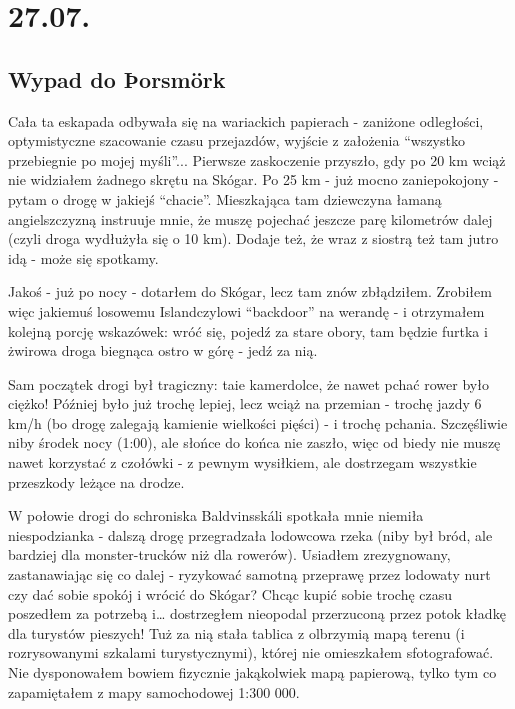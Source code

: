 \chapter{27.07.}

\section{Wypad do Þorsmörk}


Cała ta eskapada odbywała się na wariackich papierach - zaniżone odległości, optymistyczne szacowanie czasu przejazdów, wyjście z założenia “wszystko przebiegnie po mojej myśli”... Pierwsze zaskoczenie przyszło, gdy po 20 km wciąż nie widziałem żadnego skrętu na Skógar. Po 25 km - już mocno zaniepokojony - pytam o drogę w jakiejś “chacie”. Mieszkająca tam dziewczyna łamaną angielszczyzną instruuje mnie, że muszę pojechać jeszcze parę kilometrów dalej (czyli droga wydłużyła się o 10 km). Dodaje też, że wraz z siostrą też tam jutro idą - może się spotkamy.

Jakoś - już po nocy - dotarłem do Skógar, lecz tam znów zbłądziłem. Zrobiłem więc jakiemuś losowemu Islandczylowi “backdoor” na werandę - i otrzymałem kolejną porcję wskazówek: wróć się, pojedź za stare obory, tam będzie furtka i żwirowa droga biegnąca ostro w górę - jedź za nią.

Sam początek drogi był tragiczny: taie kamerdolce, że nawet pchać rower było ciężko! Później było już trochę lepiej, lecz wciąż na przemian - trochę jazdy 6 km/h (bo drogę zalegają kamienie wielkości pięści) - i trochę pchania. Szczęśliwie niby środek nocy (1:00), ale słońce do końca nie zaszło, więc od biedy nie muszę nawet korzystać z czołówki - z pewnym wysiłkiem, ale dostrzegam wszystkie przeszkody leżące na drodze.

W połowie drogi do schroniska Baldvinsskáli spotkała mnie niemiła niespodzianka - dalszą drogę przegradzała lodowcowa rzeka (niby był bród, ale bardziej dla monster-trucków niż dla rowerów). Usiadłem zrezygnowany, zastanawiając się co dalej - ryzykować samotną przeprawę przez lodowaty nurt czy dać sobie spokój i wrócić do Skógar? Chcąc kupić sobie trochę czasu poszedłem za potrzebą i… dostrzegłem nieopodal przerzuconą przez potok kładkę dla turystów pieszych! Tuż za nią stała tablica z olbrzymią mapą terenu (i rozrysowanymi szkalami turystycznymi), której nie omieszkałem sfotografować. Nie dysponowałem bowiem fizycznie jakąkolwiek mapą papierową, tylko tym co zapamiętałem z mapy samochodowej 1:300 000.

